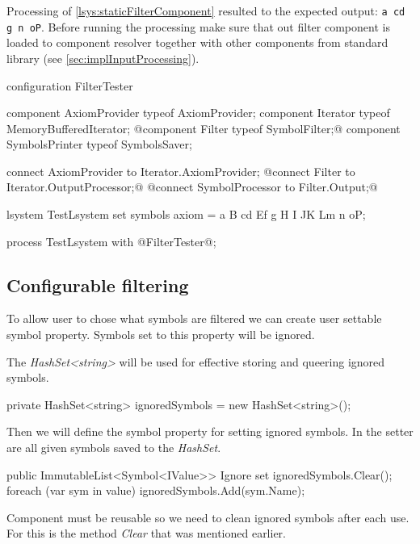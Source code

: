 Processing of \autoref{lsys:staticFilterComponent} resulted to the expected output: \texttt{a cd g n oP}.
Before running  the processing make sure that out filter component is loaded to component resolver together with other components from standard library (see \autoref{sec:implInputProcessing}).


\begin{Lsystem}[label=lsys:staticFilterComponent,caption={\lsystem code for testing the filter component}]
configuration FilterTester {
	component AxiomProvider typeof AxiomProvider;
	component Iterator typeof MemoryBufferedIterator;
	@component Filter typeof SymbolFilter;@
	component SymbolsPrinter typeof SymbolsSaver;

	connect AxiomProvider to Iterator.AxiomProvider;
	@connect Filter to Iterator.OutputProcessor;@
	@connect SymbolProcessor to Filter.Output;@
}

lsystem TestLsystem {
	set symbols axiom = a B cd Ef g H I JK Lm n oP;
}

process TestLsystem with @FilterTester@;
\end{Lsystem}



\subsection{Configurable filtering}

To allow user to chose what symbols are filtered we can create user settable symbol property.
Symbols set to this property will be ignored.

The \emph{HashSet<string>} will be used for effective storing and queering ignored symbols.

\begin{Csharp}
private HashSet<string> ignoredSymbols = new HashSet<string>();
\end{Csharp}

Then we will define the symbol property for setting ignored symbols.
In the setter are all given symbols saved to the \emph{HashSet}.

\begin{Csharp}
public ImmutableList<Symbol<IValue>> Ignore {
	set {
		ignoredSymbols.Clear();
		foreach (var sym in value) {
			ignoredSymbols.Add(sym.Name);
		}
	}
}
\end{Csharp}

Component must be reusable so we need to clean ignored symbols after each use.
For this is the method \emph{Clear} that was mentioned earlier.

